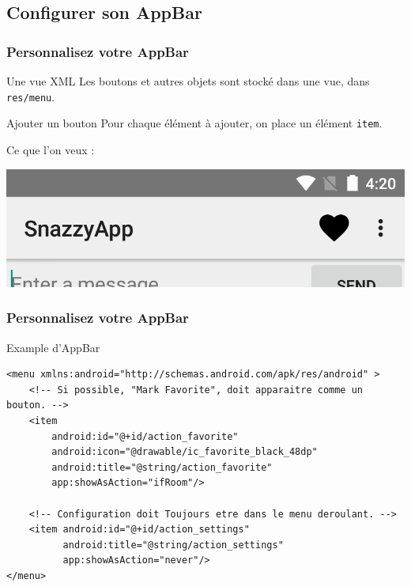 \documentclass{beamer}
\begin{document}
\subsection{Configurer son AppBar}

\begin{frame}
\frametitle{Personnalisez votre AppBar}
\begin{block}{Une vue XML}
  Les boutons et autres objets sont stocké dans une vue, dans \verb!res/menu!.
\end{block}
\pause
\begin{block}{Ajouter un bouton}
  Pour chaque élément à ajouter, on place un élément \verb!item!.
\end{block}
\pause
\begin{block}{Ce que l'on veux :}
  \begin{center}
  \includegraphics[scale=0.2]{appbar_modif.png}
  \end{center}
\end{block}
\end{frame}

\begin{frame}[fragile]
\frametitle{Personnalisez votre AppBar}
\begin{exampleblock}{Example d'AppBar}
\lstset{language=xml}
\begin{lstlisting}
<menu xmlns:android="http://schemas.android.com/apk/res/android" >
    <!-- Si possible, "Mark Favorite", doit apparaitre comme un bouton. -->
    <item
        android:id="@+id/action_favorite"
        android:icon="@drawable/ic_favorite_black_48dp"
        android:title="@string/action_favorite"
        app:showAsAction="ifRoom"/>

    <!-- Configuration doit Toujours etre dans le menu deroulant. -->
    <item android:id="@+id/action_settings"
          android:title="@string/action_settings"
          app:showAsAction="never"/>
</menu>
\end{lstlisting}
\lstset{language=java}
\end{exampleblock}

\end{frame}
\end{document}
